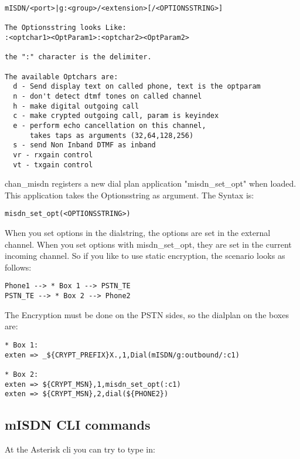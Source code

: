 \begin{astlisting}
\begin{verbatim}
mISDN/<port>|g:<group>/<extension>[/<OPTIONSSTRING>]

The Optionsstring looks Like:
:<optchar1><OptParam1>:<optchar2><OptParam2>

the ":" character is the delimiter.

The available Optchars are:
  d - Send display text on called phone, text is the optparam
  n - don't detect dtmf tones on called channel
  h - make digital outgoing call
  c - make crypted outgoing call, param is keyindex
  e - perform echo cancellation on this channel,
      takes taps as arguments (32,64,128,256)
  s - send Non Inband DTMF as inband
  vr - rxgain control
  vt - txgain control
\end{verbatim}
\end{astlisting}

chan\_misdn registers a new dial plan application "misdn\_set\_opt" when
loaded. This application takes the Optionsstring as argument. The Syntax is:

\begin{verbatim}
misdn_set_opt(<OPTIONSSTRING>)
\end{verbatim}

When you set options in the dialstring, the options are set in the external
channel. When you set options with misdn\_set\_opt, they are set in the current
incoming channel. So if you like to use static encryption, the scenario looks
as follows:

\begin{verbatim}
Phone1 --> * Box 1 --> PSTN_TE
PSTN_TE --> * Box 2 --> Phone2
\end{verbatim}

The Encryption must be done on the PSTN sides, so the dialplan on the boxes
are:

\begin{verbatim}
* Box 1:
exten => _${CRYPT_PREFIX}X.,1,Dial(mISDN/g:outbound/:c1)

* Box 2:
exten => ${CRYPT_MSN},1,misdn_set_opt(:c1)
exten => ${CRYPT_MSN},2,dial(${PHONE2})
\end{verbatim}


\subsection{mISDN CLI commands}

At the Asterisk cli you can try to type in:


